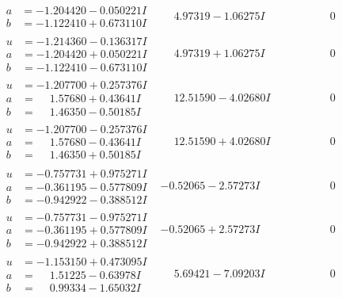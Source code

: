 \documentclass[1p]{elsarticle_modified}
\theoremstyle{definition}
\begin{document}
$$\begin{array}{c|c|c}
\begin{aligned}
a &= -1.204420 - 0.050221 I \\
b &= -1.122410 + 0.673110 I\end{aligned}
 & \phantom{-}4.97319 - 1.06275 I & \phantom{-0.000000 } 0 \\ \hline\begin{aligned}
u &= -1.214360 - 0.136317 I \\
a &= -1.204420 + 0.050221 I \\
b &= -1.122410 - 0.673110 I\end{aligned}
 & \phantom{-}4.97319 + 1.06275 I & \phantom{-0.000000 } 0 \\ \hline\begin{aligned}
u &= -1.207700 + 0.257376 I \\
a &= \phantom{-}1.57680 + 0.43641 I \\
b &= \phantom{-}1.46350 - 0.50185 I\end{aligned}
 & \phantom{-}12.51590 - 4.02680 I & \phantom{-0.000000 } 0 \\ \hline\begin{aligned}
u &= -1.207700 - 0.257376 I \\
a &= \phantom{-}1.57680 - 0.43641 I \\
b &= \phantom{-}1.46350 + 0.50185 I\end{aligned}
 & \phantom{-}12.51590 + 4.02680 I & \phantom{-0.000000 } 0 \\ \hline\begin{aligned}
u &= -0.757731 + 0.975271 I \\
a &= -0.361195 - 0.577809 I \\
b &= -0.942922 - 0.388512 I\end{aligned}
 & -0.52065 - 2.57273 I & \phantom{-0.000000 } 0 \\ \hline\begin{aligned}
u &= -0.757731 - 0.975271 I \\
a &= -0.361195 + 0.577809 I \\
b &= -0.942922 + 0.388512 I\end{aligned}
 & -0.52065 + 2.57273 I & \phantom{-0.000000 } 0 \\ \hline\begin{aligned}
u &= -1.153150 + 0.473095 I \\
a &= \phantom{-}1.51225 - 0.63978 I \\
b &= \phantom{-}0.99334 - 1.65032 I\end{aligned}
 & \phantom{-}5.69421 - 7.09203 I & \phantom{-0.000000 } 0 \\ \hline\begin{aligned}

\end{aligned}
\end{array}$$
\end{document}
